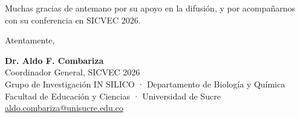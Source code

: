 \documentclass[11pt,a4paper]{article}
\begin{document}
\vspace{0.1cm}

Muchas gracias de antemano por su apoyo en la difusión, y por acompañarnos con su conferencia en SICVEC 2026.

\vspace{0.15cm}

Atentamente,

\vspace{0.15cm}

\textbf{Dr. Aldo F. Combariza}\\
Coordinador General, SICVEC 2026\\
Grupo de Investigación IN SILICO · Departamento de Biología y Química\\
Facultad de Educación y Ciencias · Universidad de Sucre\\
\href{mailto:aldo.combariza@unisucre.edu.co}{aldo.combariza@unisucre.edu.co}
\end{document}
